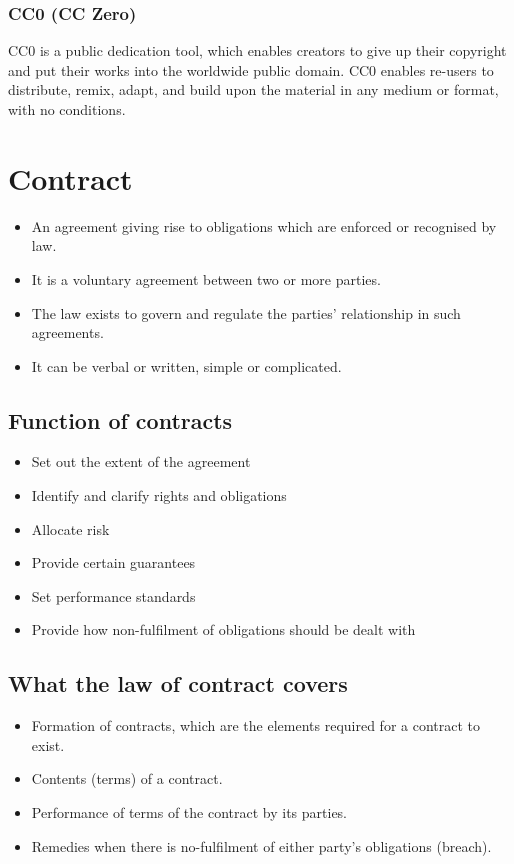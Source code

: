 \documentclass[11pt]{article}
\begin{document}
\subsubsection{CC0 (CC Zero)}
\label{sec:orgac222c5}
CC0 is a public dedication tool, which enables creators to give up their copyright and put their works into the worldwide public domain. CC0 enables re-users to distribute, remix, adapt, and build upon the material in any medium or format, with no conditions.

\clearpage
\section{Contract}
\label{sec:orge713dc6}
\begin{itemize}
\item An agreement giving rise to obligations which are enforced or recognised by law.
\item It is a voluntary agreement between two or more parties.
\item The law exists to govern and regulate the parties' relationship in such agreements.
\item It can be verbal or written, simple or complicated.
\end{itemize}
\subsection{Function of contracts}
\label{sec:org4627dc1}
\begin{itemize}
\item Set out the extent of the agreement
\item Identify and clarify rights and obligations
\item Allocate risk
\item Provide certain guarantees
\item Set performance standards
\item Provide how non-fulfilment of obligations should be dealt with
\end{itemize}
\subsection{What the law of contract covers}
\label{sec:org8e9623a}
\begin{itemize}
\item Formation of contracts, which are the elements required for a contract to exist.
\item Contents (terms) of a contract.
\item Performance of terms of the contract by its parties.
\item Remedies when there is no-fulfilment of either party's obligations (breach).
\end{itemize}
\end{document}
